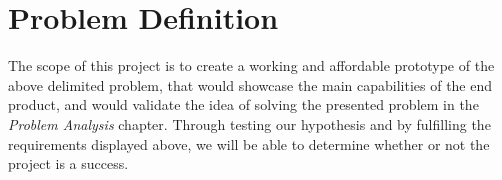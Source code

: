 \section{Problem Definition}

The scope of this project is to create a working and affordable prototype of the above delimited problem, that would showcase the main capabilities of the end product, and would validate the idea of solving the presented problem in the \textit{Problem Analysis} chapter.
Through testing our hypothesis and by fulfilling the requirements displayed above, we will be able to determine whether or not the project is a success.